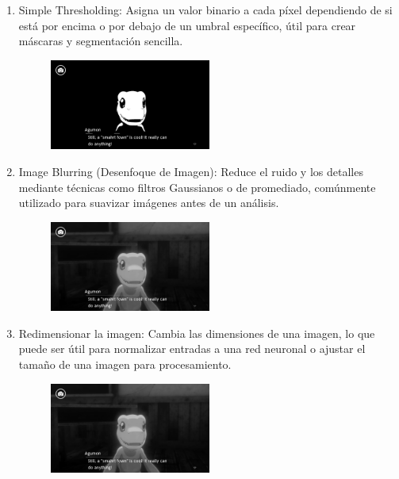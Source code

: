\begin{enumerate}
	\item Simple Thresholding: 
	Asigna un valor binario a cada píxel dependiendo de si está por encima o por debajo de un umbral específico, útil para crear máscaras y segmentación sencilla.
		\begin{figure}[H]
		\centering
		\includegraphics[width = 0.5\textwidth]{Imagenes/Preprocesado/7.png}
	\end{figure}
	
	\item Image Blurring (Desenfoque de Imagen): 
	Reduce el ruido y los detalles mediante técnicas como filtros Gaussianos o de promediado, comúnmente utilizado para suavizar imágenes antes de un análisis.
		\begin{figure}[H]
		\centering
		\includegraphics[width = 0.5\textwidth]{Imagenes/Preprocesado/8.png}
	\end{figure}
	
	\item Redimensionar la imagen: 
	Cambia las dimensiones de una imagen, lo que puede ser útil para normalizar entradas a una red neuronal o ajustar el tamaño de una imagen para procesamiento.
		\begin{figure}[H]
		\centering
		\includegraphics[width = 0.5\textwidth]{Imagenes/Preprocesado/9.png}
	\end{figure}
		

\end{enumerate}
